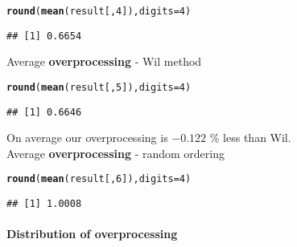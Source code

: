 \documentclass{article}\usepackage[]{graphicx}\usepackage[]{color}
\makeatletter
\newcommand{\hlnum}[1]{\textcolor[rgb]{0.686,0.059,0.569}{#1}}%
\newcommand{\hlstd}[1]{\textcolor[rgb]{0.345,0.345,0.345}{#1}}%
\newcommand{\hlkwc}[1]{\textcolor[rgb]{0.333,0.667,0.333}{#1}}%
\newcommand{\hlkwd}[1]{\textcolor[rgb]{0.737,0.353,0.396}{\textbf{#1}}}%
\newenvironment{kframe}{%
 \def\at@end@of@kframe{}%
 \ifinner\ifhmode%
  \def\at@end@of@kframe{\end{minipage}}%
  \begin{minipage}{\columnwidth}%
 \fi\fi%
 \def\FrameCommand##1{\hskip\@totalleftmargin \hskip-\fboxsep
 \colorbox{shadecolor}{##1}\hskip-\fboxsep
     \hskip-\linewidth \hskip-\@totalleftmargin \hskip\columnwidth}%
 \MakeFramed {\advance\hsize-\width
   \@totalleftmargin\z@ \linewidth\hsize
   \@setminipage}}%
 {\par\unskip\endMakeFramed%
 \at@end@of@kframe}
\newenvironment{knitrout}{}{} %
\makeatother
\begin{document}
\begin{knitrout}
\color{fgcolor}\begin{kframe}
\begin{alltt}
\hlkwd{round}\hlstd{(}\hlkwd{mean}\hlstd{(result[,}\hlnum{4}\hlstd{]),}\hlkwc{digits} \hlstd{=} \hlnum{4}\hlstd{)}
\end{alltt}
\begin{verbatim}
## [1] 0.6654
\end{verbatim}
\end{kframe}
\end{knitrout}

Average \textbf{overprocessing} - Wil method

\begin{knitrout}
\color{fgcolor}\begin{kframe}
\begin{alltt}
\hlkwd{round}\hlstd{(}\hlkwd{mean}\hlstd{(result[,}\hlnum{5}\hlstd{]),}\hlkwc{digits} \hlstd{=} \hlnum{4}\hlstd{)}
\end{alltt}
\begin{verbatim}
## [1] 0.6646
\end{verbatim}
\end{kframe}
\end{knitrout}


 
On average our overprocessing is \textbf{\ensuremath{-0.122}} \% less than Wil. \\

Average \textbf{overprocessing} - random ordering

\begin{knitrout}
\color{fgcolor}\begin{kframe}
\begin{alltt}
\hlkwd{round}\hlstd{(}\hlkwd{mean}\hlstd{(result[,}\hlnum{6}\hlstd{]),}\hlkwc{digits} \hlstd{=} \hlnum{4}\hlstd{)}
\end{alltt}
\begin{verbatim}
## [1] 1.0008
\end{verbatim}
\end{kframe}
\end{knitrout}

\paragraph{Distribution of overprocessing}
\end{document}
